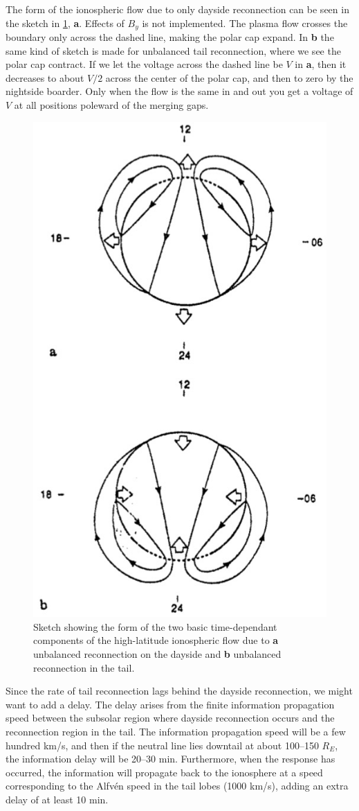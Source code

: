 The form of the ionospheric flow due to only dayside reconnection can be seen in the sketch in \cref{fig:L13_dayside_tail_reconnection_only}, \textbf{a}. Effects of \(B_y\) is not implemented. The plasma flow crosses the boundary only across the dashed line, making the polar cap expand. In \textbf{b} the same kind of sketch is made for unbalanced tail reconnection, where we see the polar cap contract. If we let the voltage across the dashed line be \(V\) in \textbf{a}, then it decreases to about \(V/2\) across the center of the polar cap, and then to zero by the nightside boarder. Only when the flow is the same in and out you get a voltage of \(V\) at all positions poleward of the merging gaps.
\begin{figure}[t]
    \centering
    \includegraphics[width=.4\linewidth]{bilder/L13_dayside_tail_reconnection_only.jpg}
    \caption{Sketch showing the form of the two basic time-dependant components of the high-latitude ionospheric flow due to \textbf{a} unbalanced reconnection on the dayside and \textbf{b} unbalanced reconnection in the tail.}\label{fig:L13_dayside_tail_reconnection_only}
\end{figure}

Since the rate of tail reconnection lags behind the dayside reconnection, we might want to add a delay. The delay arises from the finite information propagation speed between the subsolar region where dayside reconnection occurs and the reconnection region in the tail. The information propagation speed will be a few hundred km/s, and then if the neutral line lies downtail at about 100--150 \(R_E\), the information delay will be 20--30 min. Furthermore, when the response has occurred, the information will propagate back to the ionosphere at a speed corresponding to the Alfv\'{e}n speed in the tail lobes (1000 km/s), adding an extra delay of at least 10 min.


